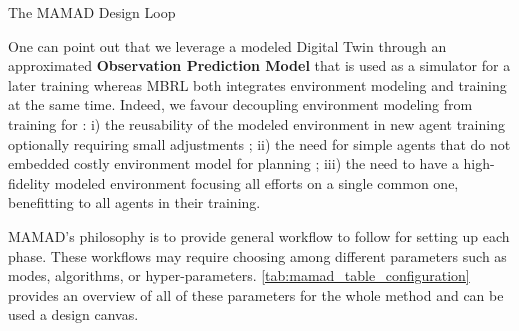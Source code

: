 \documentclass[pdflatex,sn-mathphys-num]{sn-jnl}%
\theoremstyle{thmstyleone}%
\theoremstyle{thmstyletwo}%
\theoremstyle{thmstylethree}%
\begin{document}
\begin{algorithm}[H]
    \caption{The MAMAD Design Loop}
    \label{alg:mamad-loop}
    \DontPrintSemicolon
\end{algorithm}

One can point out that we leverage a modeled Digital Twin through an approximated \textbf{Observation Prediction Model} that is used as a simulator for a later training whereas MBRL both integrates environment modeling and training at the same time. Indeed, we favour decoupling environment modeling from training for : i) the reusability of the modeled environment in new agent training optionally requiring small adjustments ; \quad ii) the need for simple agents that do not embedded costly environment model for planning ; \quad iii) the need to have a high-fidelity modeled environment focusing all efforts on a single common one, benefitting to all agents in their training.

MAMAD's philosophy is to provide general workflow to follow for setting up each phase. These workflows may require choosing among different parameters such as modes, algorithms, or hyper-parameters. \autoref{tab:mamad_table_configuration} provides an overview of all of these parameters for the whole method and can be used a design canvas.
\end{document}
